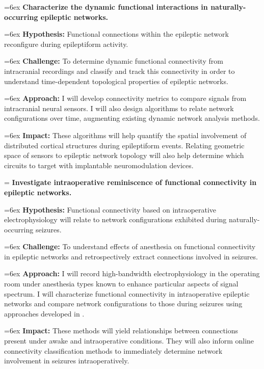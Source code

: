 


\hangindent=6ex
\noindent
{} \textbf{Characterize the dynamic functional interactions in naturally-occurring epileptic networks.}

\hangindent=6ex
\textbf{Hypothesis:} Functional connections within the epileptic network reconfigure during epileptiform activity.

\hangindent=6ex
\textbf{Challenge:} To determine dynamic functional connectivity from intracranial recordings and classify and track this connectivity in order to understand time-dependent topological properties of epileptic networks.

\hangindent=6ex
\textbf{Approach:} I will develop connectivity metrics to compare signals from intracranial neural sensors. I will also design algorithms to relate network configurations over time, augmenting existing dynamic network analysis methods.

\hangindent=6ex
\textbf{Impact:} These algorithms will help quantify the spatial involvement of distributed cortical structures during epileptiform events. Relating geometric space of sensors to epileptic network topology will also help determine which circuits to target with implantable neuromodulation devices.


\hangindent=\parindent
{}
\noindent
{} \textbf{Investigate intraoperative reminiscence of functional connectivity in epileptic networks.}

\hangindent=6ex
\textbf{Hypothesis:} Functional connectivity based on intraoperative electrophysiology will relate to network configurations exhibited during naturally-occurring seizures.

\hangindent=6ex
\textbf{Challenge:} To understand effects of anesthesia on functional connectivity in epileptic networks and retrospectively extract connections involved in seizures.

\hangindent=6ex
\textbf{Approach:} I will record high-bandwidth electrophysiology in the operating room under anesthesia types known to enhance particular aspects of signal spectrum. I will characterize functional connectivity in intraoperative epileptic networks and compare network configurations to those during seizures using approaches developed in .

\hangindent=6ex
\textbf{Impact:} These methods will yield relationships between connections present under awake and intraoperative conditions. They will also inform online connectivity classification methods to immediately determine network involvement in seizures intraoperatively.



